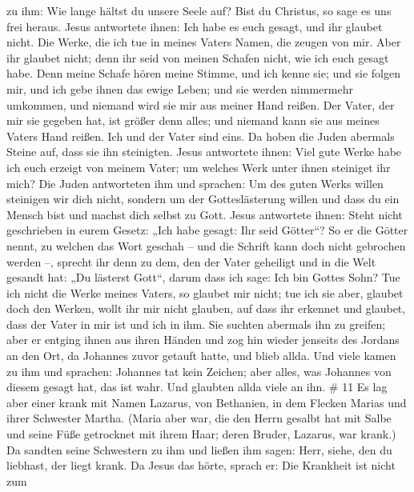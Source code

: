 zu ihm: Wie lange hältst du unsere Seele auf? Bist du Christus, so sage
es uns frei heraus.  Jesus antwortete ihnen: Ich habe es
euch gesagt, und ihr glaubet nicht. Die Werke, die ich tue in meines
Vaters Namen, die zeugen von mir.  Aber ihr glaubet nicht;
denn ihr seid von meinen Schafen nicht, wie ich euch gesagt habe.
 Denn meine Schafe hören meine Stimme, und ich kenne sie;
und sie folgen mir,  und ich gebe ihnen das ewige Leben;
und sie werden nimmermehr umkommen, und niemand wird sie mir aus meiner
Hand reißen.  Der Vater, der mir sie gegeben hat, ist
größer denn alles; und niemand kann sie aus meines Vaters Hand reißen.
 Ich und der Vater sind eins.  Da hoben die
Juden abermals Steine auf, dass sie ihn steinigten.  Jesus
antwortete ihnen: Viel gute Werke habe ich euch erzeigt von meinem
Vater; um welches Werk unter ihnen steiniget ihr mich?  Die
Juden antworteten ihm und sprachen: Um des guten Werks willen steinigen
wir dich nicht, sondern um der Gotteslästerung willen und dass du ein
Mensch bist und machst dich selbst zu Gott.  Jesus
antwortete ihnen: Steht nicht geschrieben in eurem Gesetz: „Ich habe
gesagt: Ihr seid Götter``?  So er die Götter nennt, zu
welchen das Wort geschah -- und die Schrift kann doch nicht gebrochen
werden --,  sprecht ihr denn zu dem, den der Vater
geheiligt und in die Welt gesandt hat: „Du lästerst Gott``, darum dass
ich sage: Ich bin Gottes Sohn?  Tue ich nicht die Werke
meines Vaters, so glaubet mir nicht;  tue ich sie aber,
glaubet doch den Werken, wollt ihr mir nicht glauben, auf dass ihr
erkennet und glaubet, dass der Vater in mir ist und ich in ihm.
 Sie suchten abermals ihn zu greifen; aber er entging ihnen
aus ihren Händen  und zog hin wieder jenseits des Jordans
an den Ort, da Johannes zuvor getauft hatte, und blieb allda.
 Und viele kamen zu ihm und sprachen: Johannes tat kein
Zeichen; aber alles, was Johannes von diesem gesagt hat, das ist wahr.
 Und glaubten allda viele an ihn. \# 11  Es lag
aber einer krank mit Namen Lazarus, von Bethanien, in dem Flecken Marias
und ihrer Schwester Martha.  (Maria aber war, die den Herrn
gesalbt hat mit Salbe und seine Füße getrocknet mit ihrem Haar; deren
Bruder, Lazarus, war krank.)  Da sandten seine Schwestern zu
ihm und ließen ihm sagen: Herr, siehe, den du liebhast, der liegt krank.
 Da Jesus das hörte, sprach er: Die Krankheit ist nicht zum
